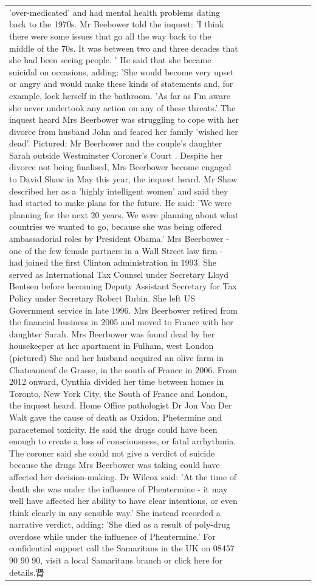 \begin{table}[H]
\begin{tabular}{lllrlllll}
'over-medicated' and had mental health problems dating back to the 1970s. Mr Beebower told the inquest: 'I think there were some issues that go all the way back to the middle of the 70s. It was between two and three decades that she had been seeing people. ' He said that she became suicidal on occasions, adding: 'She would become very upset or angry and would make these kinds of statements and, for example, lock herself in the bathroom. 'As far as I'm aware she never undertook any action on any of these threats.' The inquest heard Mrs Beerbower was struggling to cope with her divorce from husband John and feared her family 'wished her dead'. Pictured: Mr Beerbower and the couple's daughter Sarah outside Westminster Coroner's Court . Despite her divorce not being finalised, Mrs Beerbower become engaged to David Shaw in May this year, the inquest heard. Mr Shaw described her as a 'highly intelligent women' and said they had started to make plans for the future. He said: 'We were planning for the next 20 years. We were planning about what countries we wanted to go, because she was being offered ambassadorial roles by President Obama.' Mrs Beerbower - one of the few female partners in a Wall Street law firm - had joined the first Clinton administration in 1993. She served as International Tax Counsel under Secretary Lloyd Bentsen before becoming Deputy Assistant Secretary for Tax Policy under Secretary Robert Rubin. She left US Government service in late 1996. Mrs Beerbower retired from the financial business in 2005 and moved to France with her daughter Sarah. Mrs Beerbower was found dead by her housekeeper at her apartment in Fulham, west London (pictured) She and her husband acquired an olive farm in Chateauneuf de Grasse, in the south of France in 2006. From 2012 onward, Cynthia divided her time between homes in Toronto, New York City, the South of France and London, the inquest heard. Home Office pathologist Dr Jon Van Der Walt gave the cause of death as Oxidon, Phetermine and paracetemol toxicity. He said the drugs could have been enough to create a loss of consciousness, or fatal arrhythmia. The coroner said she could not give a verdict of suicide because the drugs Mrs Beerbower was taking could have affected her decision-making. Dr Wilcox said: 'At the time of death she was under the influence of Phentermine - it may well have affected her ability to have clear intentions, or even think clearly in any sensible way.' She instead recorded a narrative verdict, adding: 'She died as a result of poly-drug overdose while under the influence of Phentermine.' For confidential support call the Samaritans in the UK on 08457 90 90 90, visit a local Samaritans branch or click here for details.肾 \\

\end{tabular}
\end{table}
